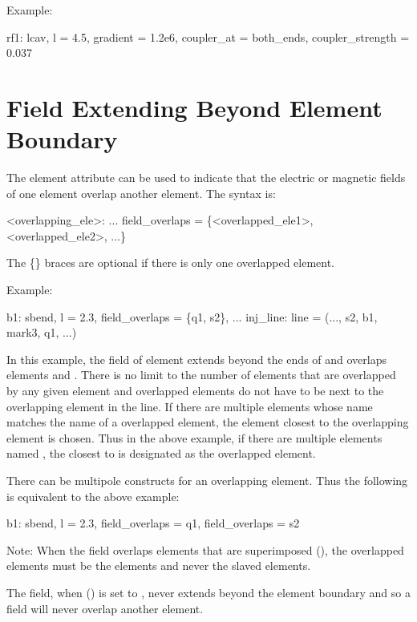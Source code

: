 Example:
\begin{example}
  rf1: lcav, l = 4.5, gradient = 1.2e6, coupler_at = both_ends,
                                                  coupler_strength = 0.037
\end{example}

\section{Field Extending Beyond Element Boundary}
\label{s:overlap}

The  element attribute can be used to indicate that the electric or
magnetic fields of one element overlap another element. The syntax is:
\begin{example}
  <overlapping_ele>: ... field_overlaps = \{<overlapped_ele1>, <overlapped_ele2>, ...\}
\end{example}
The \{\} braces are optional if there is only one overlapped element.

Example:
\begin{example}
  b1: sbend, l = 2.3, field_overlaps = \{q1, s2\}, ...
  inj_line: line = (..., s2, b1, mark3, q1, ...)
\end{example}
In this example, the field of element  extends beyond the ends of  and overlaps
elements  and . There is no limit to the number of elements that are overlapped by any
given element and overlapped elements do not have to be next to the overlapping element in the
line. If there are multiple elements whose name matches the name of a overlapped element, the
element closest to the overlapping element is chosen. Thus in the above example, if there are
multiple elements named , the closest  to  is designated as the overlapped
element.

There can be multipole  constructs for an overlapping element.
Thus the following is equivalent to the above example:
\begin{example}
  b1: sbend, l = 2.3, field_overlaps = q1, field_overlaps = s2
\end{example}

Note: When the field overlaps elements that are superimposed (), the overlapped 
elements must be the  elements and never the slaved elements.

The field, when  () is set to , never extends beyond
the element boundary and so a  field will never overlap another element.

